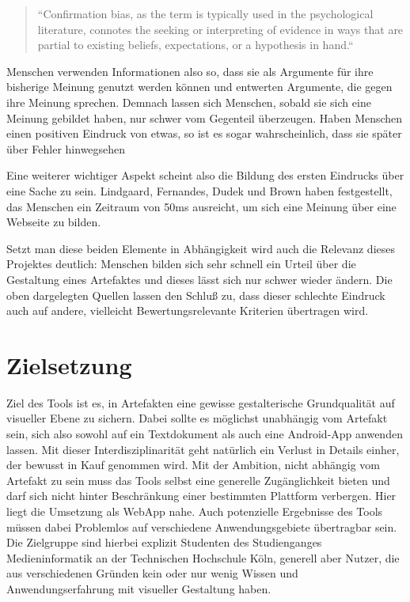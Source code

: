 \begin{quote}
“Confirmation bias, as the term is typically used in the psychological literature, connotes the seeking or interpreting of evidence in ways that are partial to existing beliefs, expectations, or a hypothesis in hand.“ \cite{nickerson1998confirmation}
\end{quote}

Menschen verwenden Informationen also so, dass sie als Argumente für ihre bisherige Meinung genutzt werden können und entwerten Argumente, die gegen ihre Meinung sprechen. Demnach lassen sich Menschen, sobald sie sich eine Meinung gebildet haben, nur schwer vom Gegenteil überzeugen.
Haben Menschen einen positiven Eindruck von etwas, so ist es sogar wahrscheinlich, dass sie später über Fehler hinwegsehen \cite{campbell1996fitting}

Eine weiterer wichtiger Aspekt scheint also die Bildung des ersten Eindrucks über eine Sache zu sein. Lindgaard, Fernandes, Dudek und Brown haben festgestellt, das Menschen ein Zeitraum von 50ms ausreicht, um sich eine Meinung über eine Webseite zu bilden. \cite{lindgaard2006attention}

Setzt man diese beiden Elemente in Abhängigkeit wird auch die Relevanz dieses Projektes deutlich: Menschen bilden sich sehr schnell ein Urteil über die Gestaltung eines Artefaktes und dieses lässt sich nur schwer wieder ändern.
Die oben dargelegten Quellen lassen den Schluß zu, dass dieser schlechte Eindruck auch auf andere, vielleicht Bewertungsrelevante Kriterien übertragen wird.



\section{Zielsetzung}
Ziel des Tools ist es, in Artefakten eine gewisse gestalterische Grundqualität auf visueller Ebene zu sichern. Dabei sollte es möglichst unabhängig vom Artefakt sein, sich also sowohl auf ein Textdokument als auch eine Android-App anwenden lassen. Mit dieser Interdisziplinarität geht natürlich ein Verlust in Details einher, der bewusst in Kauf genommen wird.
Mit der Ambition, nicht abhängig vom Artefakt zu sein muss das Tools selbst eine generelle Zugänglichkeit bieten und darf sich nicht hinter Beschränkung einer bestimmten Plattform verbergen. Hier liegt die Umsetzung als WebApp nahe. Auch potenzielle Ergebnisse des Tools müssen dabei Problemlos auf verschiedene Anwendungsgebiete übertragbar sein.
Die Zielgruppe sind hierbei explizit Studenten des Studienganges Medieninformatik an der Technischen Hochschule Köln, generell aber Nutzer, die aus verschiedenen Gründen kein oder nur wenig Wissen und Anwendungserfahrung mit visueller Gestaltung haben.

